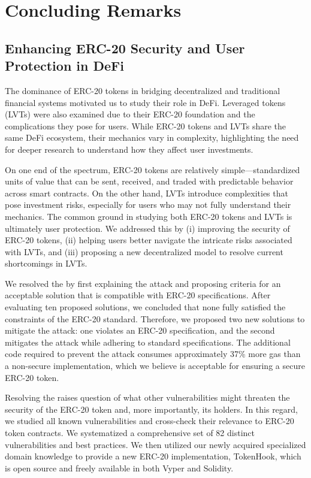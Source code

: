 
\chapter{Concluding Remarks}\label{ch:remarks}

\section{Enhancing ERC-20 Security and User Protection in DeFi}
The dominance of ERC-20 tokens in bridging decentralized and traditional financial systems motivated us to study their role in DeFi. Leveraged tokens (LVTs) were also examined due to their ERC-20 foundation and the complications they pose for users. While ERC-20 tokens and LVTs share the same DeFi ecosystem, their mechanics vary in complexity, highlighting the need for deeper research to understand how they affect user investments.

On one end of the spectrum, ERC-20 tokens are relatively simple—standardized units of value that can be sent, received, and traded with predictable behavior across smart contracts. On the other hand, LVTs introduce complexities that pose investment risks, especially for users who may not fully understand their mechanics. The common ground in studying both ERC-20 tokens and LVTs is ultimately user protection. We addressed this by (i) improving the security of ERC-20 tokens, (ii) helping users better navigate the intricate risks associated with LVTs, and (iii) proposing a new decentralized model to resolve current shortcomings in LVTs.

We resolved the \mwa by first explaining the attack and proposing criteria for an acceptable solution that is compatible with ERC-20 specifications. After evaluating ten proposed solutions, we concluded that none fully satisfied the constraints of the ERC-20 standard. Therefore, we proposed two new solutions to mitigate the attack: one violates an ERC-20 specification, and the second mitigates the attack while adhering to standard specifications. The additional code required to prevent the attack consumes approximately 37\% more gas than a non-secure implementation, which we believe is acceptable for ensuring a secure ERC-20 token.

Resolving the \mwa raises question of what other vulnerabilities might threaten the security of the ERC-20 token and, more importantly, its holders. In this regard, we studied all known vulnerabilities and cross-check their relevance to ERC-20 token contracts. We systematized a comprehensive set of 82 distinct vulnerabilities and best practices. We then utilized our newly acquired specialized domain knowledge to provide a new ERC-20 implementation, TokenHook, which is open source and freely available in both Vyper and Solidity.


